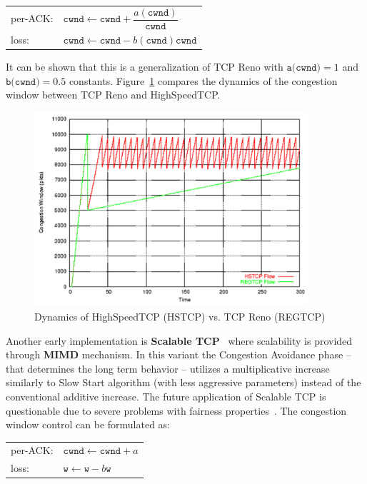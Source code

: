 \documentclass[a4paper]{article}
\begin{document}
\begin{tabular}{ll}
    per-ACK: & $\texttt{cwnd} \leftarrow \texttt{cwnd} + \dfrac{a(\texttt{cwnd})}{\texttt{cwnd}}$  \\
    loss:    & $\texttt{cwnd} \leftarrow \texttt{cwnd} - b(\texttt{cwnd})\texttt{cwnd}$            \\
\end{tabular}

It can be shown that this is a generalization of TCP Reno with $\texttt{a(cwnd)}=1$ and $\texttt{b(cwnd)}=0.5$
constants. Figure~\ref{fig:HSvsReno} compares the dynamics of the congestion window between TCP Reno and HighSpeedTCP.

\begin{figure}[H]
    \centering
    \includegraphics[width=0.9\textwidth]{figures/HSTCP.png}
    \caption{Dynamics of HighSpeedTCP (HSTCP) vs. TCP Reno (REGTCP)}
    \label{fig:HSvsReno}
\end{figure}

Another early implementation is \textbf{Scalable TCP}~\cite{ScalableTCP} where scalability is provided through
\textbf{MIMD} mechanism. In this variant the Congestion Avoidance phase  -- that determines the long term behavior --
utilizes a multiplicative increase similarly to Slow Start algorithm (with less aggressive parameters) instead of the
conventional additive increase. The future application of Scalable TCP is questionable due to severe problems with
fairness properties~\cite{TCPFairnessAnalysis}. The congestion window control can be formulated as:

\begin{tabular}{ll}
    per-ACK: & $\texttt{cwnd} \leftarrow \texttt{cwnd} + a$       \\
    loss:    & $\texttt{w} \leftarrow \texttt{w} - b \texttt{w}$  \\
\end{tabular}
\end{document}
